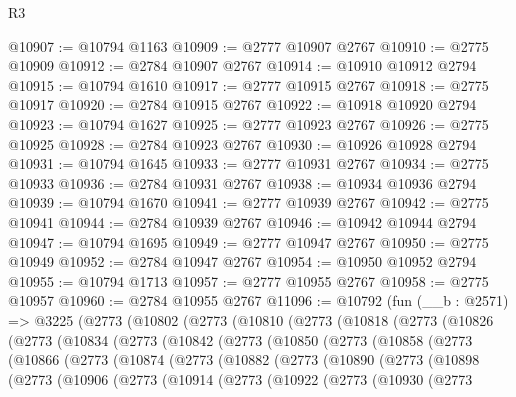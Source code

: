 \begin{lexlean}{R3}
\begin{coremodule}
@10907 := @10794 @1163
@10909 := @2777 @10907 @2767
@10910 := @2775 @10909
@10912 := @2784 @10907 @2767
@10914 := @10910 @10912 @2794
@10915 := @10794 @1610
@10917 := @2777 @10915 @2767
@10918 := @2775 @10917
@10920 := @2784 @10915 @2767
@10922 := @10918 @10920 @2794
@10923 := @10794 @1627
@10925 := @2777 @10923 @2767
@10926 := @2775 @10925
@10928 := @2784 @10923 @2767
@10930 := @10926 @10928 @2794
@10931 := @10794 @1645
@10933 := @2777 @10931 @2767
@10934 := @2775 @10933
@10936 := @2784 @10931 @2767
@10938 := @10934 @10936 @2794
@10939 := @10794 @1670
@10941 := @2777 @10939 @2767
@10942 := @2775 @10941
@10944 := @2784 @10939 @2767
@10946 := @10942 @10944 @2794
@10947 := @10794 @1695
@10949 := @2777 @10947 @2767
@10950 := @2775 @10949
@10952 := @2784 @10947 @2767
@10954 := @10950 @10952 @2794
@10955 := @10794 @1713
@10957 := @2777 @10955 @2767
@10958 := @2775 @10957
@10960 := @2784 @10955 @2767
@11096 := @10792
    (fun (__b : @2571) =>
    @3225
      (@2773
        (@10802
          (@2773
            (@10810
              (@2773
                (@10818
                  (@2773
                    (@10826
                      (@2773
                        (@10834
                          (@2773
                            (@10842
                              (@2773
                                (@10850
                                  (@2773
                                    (@10858
                                      (@2773
                                        (@10866
                                          (@2773
                                            (@10874
                                              (@2773
                                                (@10882
                                                  (@2773
                                                    (@10890
                                                      (@2773
                                                        (@10898
                                                          (@2773
                                                            (@10906
                                                              (@2773
                                                                (@10914
                                                                  (@2773
                                                                    (@10922
                                                                      (@2773
                                                                        (@10930
                                                                          (@2773

\end{coremodule}
\end{lexlean}
